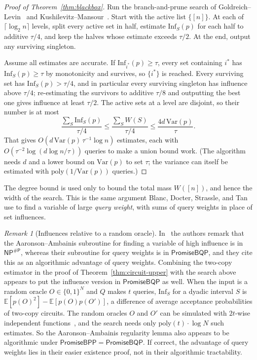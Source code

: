 \documentclass[11pt]{article}
\theoremstyle{remark}
\newtheorem{remark}[theorem]{Remark}
\newcommand{\Inf}{\mathrm{Inf}}
\newcommand{\Var}{\mathrm{Var}}
\newcommand{\E}{\mathbb{E}}
\newcommand{\poly}{\mathrm{poly}}
\newcommand{\PromiseBQP}{\mathsf{PromiseBQP}}
\newcommand{\PromiseBPP}{\mathsf{PromiseBPP}}
\begin{document}
\begin{proof}[Proof of Theorem~\ref{thm:blackbox}]
Run the branch-and-prune search of Goldreich--Levin~\cite{GL89} and
Kushilevitz--Mansour~\cite{KM93}. Start with the active list $\{[n]\}$. At each of
$\lceil\log_2 n\rceil$ levels, split every active set in half, estimate $\Inf_S(p)$ for
each half to additive $\tau/4$, and keep the halves whose estimate exceeds $\tau/2$. At
the end, output any surviving singleton.

Assume all estimates are accurate. If $\Inf_{i^*}(p)\ge\tau$, every set containing
$i^*$ has $\Inf_S(p)\ge\tau$ by monotonicity and survives, so $\{i^*\}$ is reached. Every
surviving set has $\Inf_S(p)>\tau/4$, and in particular every surviving singleton has
influence above $\tau/4$; re-estimating the survivors to additive $\tau/8$ and outputting
the best one gives influence at least $\tau/2$. The active sets at a level are disjoint,
so their number is at most
\[
\frac{\sum_S \Inf_S(p)}{\tau/4}\le\frac{\sum_S W(S)}{\tau/4}\le\frac{4d\,\Var(p)}{\tau}.
\]
That gives $O(d\,\Var(p)\,\tau^{-1}\log n)$ estimates, each with
$O(\tau^{-2}\log(d\log n/\tau))$ queries to make a union bound work. (The algorithm needs
$d$ and a lower bound on $\Var(p)$ to set $\tau$; the variance can itself be estimated
with $\poly(1/\Var(p))$ queries.)
\end{proof}

The degree bound is used only to bound the total mass $W([n])$, and hence the width of
the search. This is the same argument Blanc, Docter, Strassle, and Tan~\cite[Prop.~10.6]{BDST26}
use to find a variable of large \emph{query weight}, with sums of query weights in
place of set influences.

\begin{remark}[Influences relative to a random oracle]
In~\cite{BDST26} the authors remark that the Aaronson--Ambainis subroutine for finding
a variable of high influence is in $\mathsf{NP}^{\#\mathsf{P}}$, whereas their
subroutine for query weights is in $\PromiseBQP$, and they cite this as an algorithmic
advantage of query weights. Combining the two-copy estimator in the proof of
Theorem~\ref{thm:circuit-upper} with the search above appears to put the influence
version in $\PromiseBQP$ as well. When the input is a random oracle
$O\in\{0,1\}^N$ and $Q$ makes $t$ queries, $\Inf_S$ for a dyadic interval $S$ is
$\E[p(O)^2]-\E[p(O)p(O')]$, a difference of average acceptance probabilities of
two-copy circuits. The random oracles $O$ and $O'$ can be simulated with
$2t$-wise independent functions~\cite{Zha12}, and the search needs only
$\poly(t)\cdot\log N$ such estimates. So the Aaronson--Ambainis regularity lemma also appears
to be algorithmic under $\PromiseBPP=\PromiseBQP$. If correct, the advantage of query
weights lies in their easier existence proof, not in their algorithmic tractability.
\end{remark}
\end{document}

